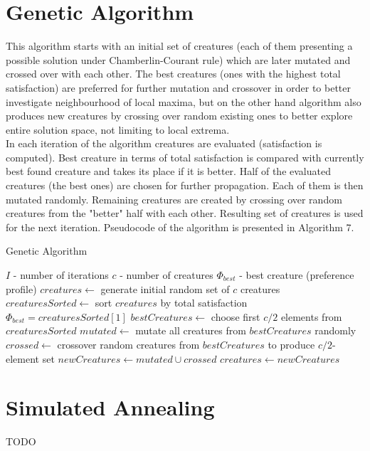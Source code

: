 \section{Genetic Algorithm}

This algorithm starts with an initial set of creatures (each of them presenting a possible solution under Chamberlin-Courant rule) which are later mutated and crossed over with each other. The best creatures (ones with the highest total satisfaction) are preferred for further mutation and crossover in order to better investigate neighbourhood of local maxima, but on the other hand algorithm also produces new creatures by crossing over random existing ones to better explore entire solution space, not limiting to local extrema.
\\

In each iteration of the algorithm creatures are evaluated (satisfaction is computed). Best creature in terms of total satisfaction is compared with currently best found creature and takes its place if it is better. Half of the evaluated creatures (the best ones) are chosen for further propagation. Each of them is then mutated randomly. Remaining creatures are created by crossing over random creatures from the "better" half with each other. Resulting set of creatures is used for the next iteration. Pseudocode of the algorithm is presented in Algorithm 7.

\begin{algorithm}
\caption{Genetic Algorithm}\label{euclid}
\begin{algorithmic}[1]
		\State $I$ - number of iterations
		\State $c$ - number of creatures
		\State $\Phi_{best}$ - best creature (preference profile)
		\State $creatures \gets$ generate initial random set of $c$ creatures
			\State $creaturesSorted \gets$ sort $creatures$ by total satisfaction
				\State $\Phi_{best} = creaturesSorted[1]$
			\EndIf
			\State $bestCreatures \gets$ choose first $c/2$ elements from $creaturesSorted$
			\State $mutated \gets$ mutate all creatures from $bestCreatures$ randomly
			\State $crossed \gets$ crossover random creatures from $bestCreatures$ to produce $c/2$-element set
			\State $newCreatures \gets mutated \cup crossed$
			\State $creatures \gets newCreatures$
		\EndFor
	\EndProcedure
\end{algorithmic}
\end{algorithm}

\section{Simulated Annealing}

TODO

